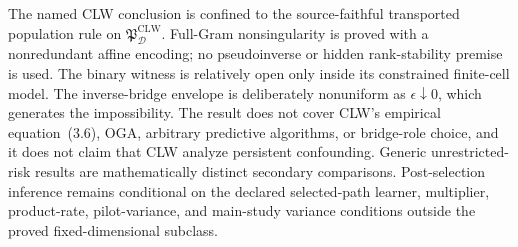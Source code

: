 The named CLW conclusion is confined to the source-faithful transported population rule on \(\mathfrak P_{\mathcal D}^{\mathrm{CLW}}\). Full-Gram nonsingularity is proved with a nonredundant affine encoding; no pseudoinverse or hidden rank-stability premise is used. The binary witness is relatively open only inside its constrained finite-cell model. The inverse-bridge envelope is deliberately nonuniform as \(\epsilon\downarrow0\), which generates the impossibility. The result does not cover CLW's empirical equation~(3.6), OGA, arbitrary predictive algorithms, or bridge-role choice, and it does not claim that CLW analyze persistent confounding. Generic unrestricted-risk results are mathematically distinct secondary comparisons. Post-selection inference remains conditional on the declared selected-path learner, multiplier, product-rate, pilot-variance, and main-study variance conditions outside the proved fixed-dimensional subclass.